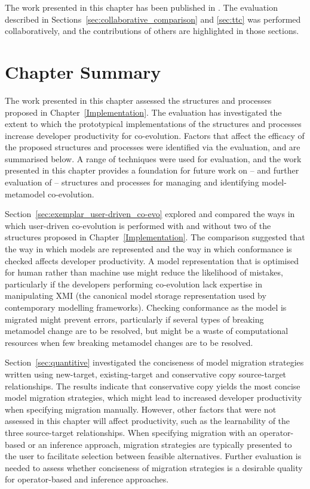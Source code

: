 The work presented in this chapter has been published in \cite{rose10comparison,rose10ttc_solution,rose10ttc_case}. The evaluation described in Sections~\ref{sec:collaborative_comparison} and \ref{sec:ttc} was performed collaboratively, and the contributions of others are highlighted in those sections.








\section{Chapter Summary}
The work presented in this chapter assessed the structures and processes proposed in Chapter~\ref{Implementation}. The evaluation has investigated the extent to which the prototypical implementations of the structures and processes increase developer productivity for co-evolution. Factors that affect the efficacy of the proposed structures and processes were identified via the evaluation, and are summarised below. A range of techniques were used for evaluation, and the work presented in this chapter provides a foundation for future work on -- and further evaluation of -- structures and processes for managing and identifying model-metamodel co-evolution.

Section~\ref{sec:exemplar_user-driven_co-evo} explored and compared the ways in which user-driven co-evolution is performed with and without two of the structures proposed in Chapter~\ref{Implementation}. The comparison suggested that the way in which models are represented and the way in which conformance is checked affects developer productivity. A model representation that is optimised for human rather than machine use might reduce the likelihood of mistakes, particularly if the developers performing co-evolution lack expertise in manipulating XMI (the canonical model storage representation used by contemporary modelling frameworks). Checking conformance as the model is migrated might prevent errors, particularly if several types of breaking metamodel change are to be resolved, but might be a waste of computational resources when few breaking metamodel changes are to be resolved.

Section~\ref{sec:quantitive} investigated the conciseness of model migration strategies written using new-target, existing-target and conservative copy source-target relationships. The results indicate that conservative copy yields the most concise model migration strategies, which might lead to increased developer productivity when specifying migration manually. However, other factors that were not assessed in this chapter will affect productivity, such as the learnability of the three source-target relationships. When specifying migration with an operator-based or an inference approach, migration strategies are typically presented to the user to facilitate selection between feasible alternatives. Further evaluation is needed to assess whether conciseness of migration strategies is a desirable quality for operator-based and inference approaches.
 
